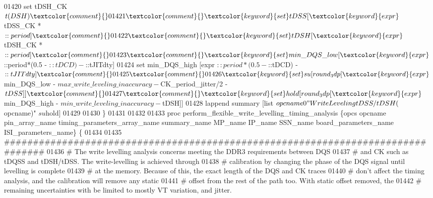 \begin{DoxyCode}
01420 \textcolor{comment}{}   \textcolor{keyword}{set} tDSH\_CK $t(DSH)\textcolor{comment}{}
01421 \textcolor{comment}{}   \textcolor{keyword}{set} tDSS [\textcolor{keyword}{expr} $tDSS\_CK * $::period]\textcolor{comment}{}
01422 \textcolor{comment}{}   \textcolor{keyword}{set} tDSH [\textcolor{keyword}{expr} $tDSH\_CK * $::period]\textcolor{comment}{}
01423 \textcolor{comment}{}   \textcolor{keyword}{set} min\_DQS\_low [\textcolor{keyword}{expr} $::period*(0.5 - $::tDCD) - $::tJITdty]\textcolor{comment}{}
01424 \textcolor{comment}{}   \textcolor{keyword}{set} min\_DQS\_high [\textcolor{keyword}{expr} $::period*(0.5 - $::tDCD) - $::tJITdty]\textcolor{comment}{}
01425 \textcolor{comment}{}   
01426    \textcolor{keyword}{set} su [round_3dp [\textcolor{keyword}{expr} $min\_DQS\_low - $max\_write\_leveling\_inaccuracy - $CK\_period\_jitter/2 - $tDSS
      ]]\textcolor{comment}{}
01427 \textcolor{comment}{}   \textcolor{keyword}{set} hold [round_3dp [\textcolor{keyword}{expr} $min\_DQS\_high - $min\_write\_leveling\_inaccuracy - $tDSH]]\textcolor{comment}{}
01428 \textcolor{comment}{}   \textcolor{keyword}{lappend} summary [list $opcname 0 "Write Leveling tDSS/tDSH ($opcname)" $su $hold]\textcolor{comment}{}
01429 \textcolor{comment}{}
01430 \}\textcolor{comment}{}
01431 \textcolor{comment}{}
01432 
01433 \textcolor{keyword}{proc} perform\_flexible\_write\_levelling\_timing\_analysis \{opcs opcname pin\_array\_name
       timing\_parameters\_array\_name summary\_name  MP\_name IP\_name SSN\_name board\_parameters\_name ISI\_parameters\_name\} \{
01434 
01435    \textcolor{comment}{################################################################################}
01436 \textcolor{comment}{}\textcolor{comment}{   }\textcolor{comment}{# The write levelling analysis concerns meeting the DDR3 requirements between DQS }
01437 \textcolor{comment}{}\textcolor{comment}{   }\textcolor{comment}{# and CK such as tDQSS and tDSH/tDSS.  The write-levelling is achieved through }
01438 \textcolor{comment}{}\textcolor{comment}{   }\textcolor{comment}{# calibration by changing the phase of the DQS signal until levelling is complete }
01439 \textcolor{comment}{}\textcolor{comment}{   }\textcolor{comment}{# at the memory.  Because of this, the exact length of the DQS and CK traces }
01440 \textcolor{comment}{}\textcolor{comment}{   }\textcolor{comment}{# don't affect the timing analysis, and the calibration will remove any static }
01441 \textcolor{comment}{}\textcolor{comment}{   }\textcolor{comment}{# offset from the rest of the path too.  With static offset removed, the }
01442 \textcolor{comment}{}\textcolor{comment}{   }\textcolor{comment}{# remaining uncertainties with be limited to mostly VT variation, and jitter.}

\end{DoxyCode}
